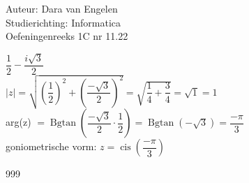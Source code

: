 \documentclass[a4paper]{article}
\begin{document}
  
\noindent \large Auteur: Dara van Engelen \\
\noindent \large Studierichting: Informatica\\
\noindent \large Oefeningenreeks 1C nr 11.22\\

\medskip

\normalsize

$ \dfrac{1}{2} - \dfrac{i\sqrt{3}}{2} $\\

$ |z| = \sqrt{\left(\dfrac{1}{2}\right)^2 + \left( \dfrac{-\sqrt{3}}{2}\right)^2} = \sqrt{\dfrac{1}{4} + \dfrac{3}{4}} = \sqrt{1} = 1$\\

arg(z)  $= \operatorname{Bgtan}\left( \dfrac{-\sqrt{3}}{2} \cdot \dfrac{1}{2}\right) = \operatorname{Bgtan}\left( -\sqrt{3}\right) = \dfrac{-\pi}{3}$\\

goniometrische vorm: $ z = \operatorname{cis} \left (\dfrac{-\pi}{3}\right)$


\begin{thebibliography}{999}
\end{thebibliography}
\end{document}
